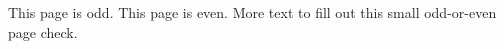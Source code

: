 \documentclass{article}
\begin{document}
\checkoddpage
\ifoddpage This page is odd. \else This page is even. \fi
More text to fill out this small odd-or-even page check.
\end{document}

